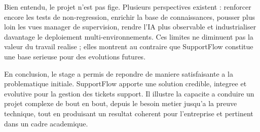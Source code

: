Bien entendu, le projet n'est pas fige. Plusieurs perspectives existent : renforcer encore les tests de non-regression, enrichir la base de connaissances, pousser plus loin les vues manager de supervision, rendre l'IA plus observable et industrialiser davantage le deploiement multi-environnements. Ces limites ne diminuent pas la valeur du travail realise ; elles montrent au contraire que SupportFlow constitue une base serieuse pour des evolutions futures.

En conclusion, le stage a permis de repondre de maniere satisfaisante a la problematique initiale. SupportFlow apporte une solution credible, integree et evolutive pour la gestion des tickets support. Il illustre la capacite a conduire un projet complexe de bout en bout, depuis le besoin metier jusqu'a la preuve technique, tout en produisant un resultat coherent pour l'entreprise et pertinent dans un cadre academique.
